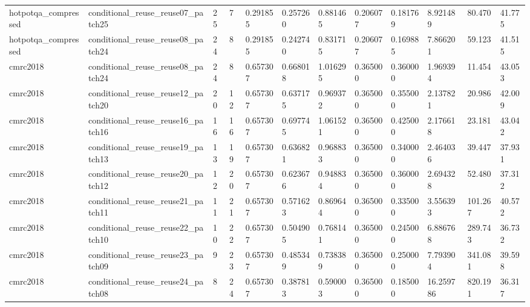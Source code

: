 \begin{tabular}{llllllllllll}
hotpotqa\_compressed & conditional\_reuse\_reuse07\_patch25 & 25 & 7 & 0.291855 & 0.257260 & 0.881465 & 0.206077 & 0.181769 & 8.921489 & 80.470 & 41.775 \\
hotpotqa\_compressed & conditional\_reuse\_reuse08\_patch24 & 24 & 8 & 0.291855 & 0.242740 & 0.831715 & 0.206077 & 0.169885 & 7.866201 & 59.123 & 41.515 \\
cmrc2018 & conditional\_reuse\_reuse08\_patch24 & 24 & 8 & 0.657307 & 0.668018 & 1.016295 & 0.365000 & 0.360000 & 1.969394 & 11.454 & 43.053 \\
cmrc2018 & conditional\_reuse\_reuse12\_patch20 & 20 & 12 & 0.657307 & 0.637175 & 0.969372 & 0.365000 & 0.355000 & 2.137821 & 20.986 & 42.009 \\
cmrc2018 & conditional\_reuse\_reuse16\_patch16 & 16 & 16 & 0.657307 & 0.697745 & 1.061521 & 0.365000 & 0.425000 & 2.176618 & 23.181 & 43.042 \\
cmrc2018 & conditional\_reuse\_reuse19\_patch13 & 13 & 19 & 0.657307 & 0.636821 & 0.968833 & 0.365000 & 0.340000 & 2.464036 & 39.447 & 37.931 \\
cmrc2018 & conditional\_reuse\_reuse20\_patch12 & 12 & 20 & 0.657307 & 0.623676 & 0.948834 & 0.365000 & 0.360000 & 2.694328 & 52.480 & 37.312 \\
cmrc2018 & conditional\_reuse\_reuse21\_patch11 & 11 & 21 & 0.657307 & 0.571623 & 0.869644 & 0.365000 & 0.335000 & 3.556393 & 101.267 & 40.572 \\
cmrc2018 & conditional\_reuse\_reuse22\_patch10 & 10 & 22 & 0.657307 & 0.504905 & 0.768141 & 0.365000 & 0.245000 & 6.886768 & 289.743 & 36.732 \\
cmrc2018 & conditional\_reuse\_reuse23\_patch09 & 9 & 23 & 0.657307 & 0.485349 & 0.738389 & 0.365000 & 0.250000 & 7.793904 & 341.081 & 39.598 \\
cmrc2018 & conditional\_reuse\_reuse24\_patch08 & 8 & 24 & 0.657307 & 0.387813 & 0.590003 & 0.365000 & 0.185000 & 16.259786 & 820.191 & 36.317 \\
\bottomrule
\end{tabular}

